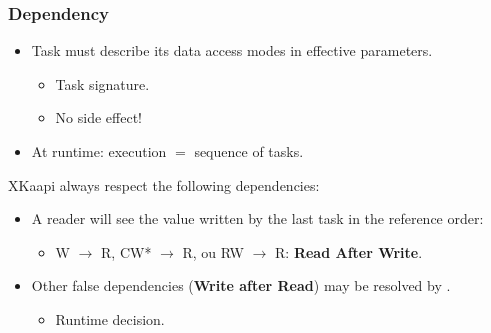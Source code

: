 \begin{frame}
  \frametitle{Dependency}
  \begin{itemize}
  \item Task must describe its data access modes in effective parameters.
    \begin{itemize}
    \item Task signature.
    \item No side effect!
    \end{itemize}
  \item At runtime: execution $=$ sequence of tasks.
  \end{itemize}
  \begin{exampleblock}{XKaapi always respect the following dependencies:}
    \begin{itemize}
    \item A reader will see the value written by the last task in the reference order:
      \begin{itemize}
      \item W $\rightarrow$ R, {CW}* $\rightarrow$ R, ou RW $\rightarrow$ R: {\bf Read After Write}.
      \end{itemize}
    \item Other false dependencies (\textbf{Write after Read}) may be resolved by 
      .
      \begin{itemize}
      \item Runtime decision.
      \end{itemize}
    \end{itemize}
  \end{exampleblock}
\end{frame}
